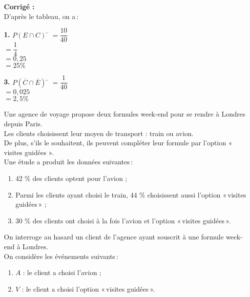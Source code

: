 \documentclass[a4paper,11pt,exos]{nsi} %
\begin{document}
\textcolor{UGLiBlue}{\textbf{Corrigé :}\\
D'après le tableau, on a\,:
\begin{multicols}{2}
    \begin{tabbing}
        \textbf{1.} $P(E\cap C)$ \= $=\dfrac{10}{40}$\\[.5em]
        \> $=\dfrac{1}{4}$\\[.5em]
        \> $=0{,}25$\\[.5em]
        \> $=25\%$
    \end{tabbing}
    \begin{tabbing}
        \textbf{3.} $P(\overline{C}\cap \overline{E})$ \= $=\dfrac{1}{40}$\\[.5em]
        \> $=0,025$\\[.5em]
        \> $=2,5\%$
    \end{tabbing}
\end{multicols}
}
\newpage

\exo{}
Une agence de voyage propose deux formules week-end pour se rendre à Londres depuis Paris.\\ Les clients choisissent leur moyen de transport : train ou avion.\\ De plus, s'ils le souhaitent, ils peuvent compléter leur formule par l'option  « visites guidées ».\\[.5em]
Une étude a produit les données suivantes\,:
\begin{enumerate}[label=\textbullet]
    \item 42 \% des clients optent pour l'avion ;
    \item Parmi les clients ayant choisi le train, 44 \% choisissent aussi l'option  «\,visites guidées\,» ;
    \item 30 \% des clients ont choisi à la fois l'avion et l'option  «\,visites guidées\,».
\end{enumerate}

 On interroge au hasard un client de l'agence ayant souscrit à une formule week-end à Londres.\\ On considère les événements suivants\,:
 \begin{enumerate}[label=\textbullet]
     \item $A$ :  le client a choisi l'avion ;
     \item $V$ : le client a choisi l'option  «\,visites guidées\,».
 \end{enumerate}
\end{document}
